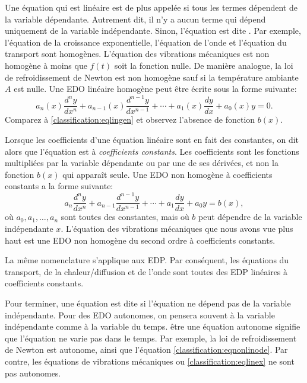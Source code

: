 Une équation qui est linéaire est de plus appelée \emph{} si tous les termes dépendent de la variable dépendante.  Autrement dit, il n'y a aucun terme qui dépend uniquement de la variable indépendante.  Sinon, l'équation est dite \emph{}.  Par exemple, l'équation de la croissance exponentielle, l'équation de l'onde et l'équation du transport sont homogènes.  L'équation des vibrations mécaniques est non homogène à moins que $f(t)$ soit la fonction nulle.  De manière analogue, la loi de refroidissement de Newton est non homogène sauf si la température ambiante $A$ est nulle.
Une EDO linéaire homogène peut être écrite sous la forme suivante: 
\begin{equation*}
a_n(x) \frac{d^n y}{dx^n} 
	+ a_{n-1}(x) \frac{d^{n-1} y}{dx^{n-1}} 
	+ \cdots
	+ a_{1}(x) \frac{dy}{dx}
	+ a_{0}(x) y = 0 .
\end{equation*}
Comparez à \eqref{classification:eqlingen} et observez l'absence de fonction $b(x)$.

\medskip

Lorsque les coefficients d'une équation linéaire sont en fait des constantes, on dit alors que l'équation est à 
\emph{coefficients constants}.
Les coefficients sont les fonctions multipliées par la variable dépendante ou par une de ses dérivées, et non la fonction $b(x)$ qui appara\^it seule.
Une EDO non homogène à coefficients constants a la forme suivante: 
\begin{equation*}
	a_n \frac{d^n y}{dx^n} 
		+ a_{n-1} \frac{d^{n-1} y}{dx^{n-1}} 
		+ \cdots
		+ a_{1} \frac{dy}{dx}
		+ a_{0} y 
		= b(x), 
\end{equation*}
où $a_0, a_1, \ldots, a_n$ sont toutes des constantes, mais 
où $b$ peut dépendre de la variable indépendante $x$.
L'équation des vibrations mécaniques que nous avons vue plus haut est une EDO non homogène du second ordre à coefficients constants.  

La même nomenclature s'applique aux EDP.  Par conséquent, les équations du transport, de la chaleur/diffusion et de l'onde sont toutes des EDP linéaires à coefficients constants.

\medskip

Pour terminer, une équation est dite \emph{}
 si l'équation ne dépend pas de la variable indépendante.  Pour des EDO autonomes, on pensera souvent à la variable indépendante comme à la variable du temps.  être une équation autonome signifie que l'équation ne varie pas dans le temps.  Par exemple, la loi de refroidissement de Newton est autonome, ainsi que l'équation \eqref{classification:eqnonlinode}.  Par contre, les équations de vibrations mécaniques ou \eqref{classification:eqlinex} ne sont pas autonomes.


